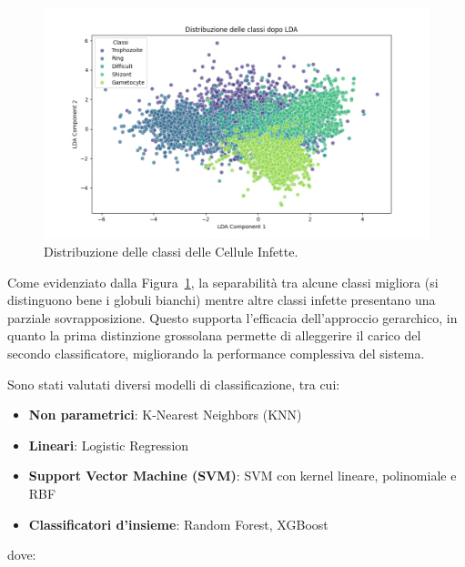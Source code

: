 \documentclass[minted, draw]{../tex/hebdomon}
\begin{document}
\begin{itemize}
% 
\begin{figure}[H]
  \centering
  \includegraphics[width=.8\linewidth]{figures/lda_distribution.png}
  \caption{Distribuzione delle classi delle Cellule Infette.}
  \label{fig:lda_infette}
\end{figure}
%

Come evidenziato dalla Figura~\ref{fig:lda_infette}, la separabilità tra alcune classi migliora (si distinguono bene i globuli bianchi) mentre altre classi infette presentano una parziale sovrapposizione. Questo supporta l’efficacia dell’approccio gerarchico, in quanto la prima distinzione grossolana permette di alleggerire il carico del secondo classificatore, migliorando la performance complessiva del sistema.

\end{itemize}

Sono stati valutati diversi modelli di classificazione, tra cui:


\begin{itemize}
\item \textbf{Non parametrici}: K-Nearest Neighbors (KNN)
\item \textbf{Lineari}: Logistic Regression
\item \textbf{Support Vector Machine (SVM)}: SVM con kernel lineare, polinomiale e RBF 
\item \textbf{Classificatori d’insieme}: Random Forest, XGBoost
\end{itemize}

dove:
\end{document}
